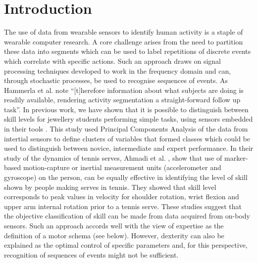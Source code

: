 \documentclass{sigchi}
\begin{document}


\section{Introduction}

The use of data from wearable sensors to identify human activity is a staple of wearable computer research.
A core challenge arises from the need to partition these data into segments 
which can be used to label repetitions of discrete events which correlate with specific actions. 
Such an approach draws on signal processing techniques developed to work in the frequency domain and can, 
through stochastic processes, be used to recognise sequences of events.  As Hammerla et al. \cite{Hammerla2011}
note ``[t]herefore information about what subjects are doing is readily available, rendering activity 
segmentation a straight-forward follow up task''. 
In previous work, we have shown that it is possible to distinguish between skill levels for jewellery 
students performing simple tasks, using sensors embedded in their tools \cite{RefXXX}.
This study used Principal Components Analysis of the data from intertial sensors to define 
clusters of variables that formed classes which could be used to distinguish between novice, intermediate 
and expert performance.  In their study of the dynamics of tennis serves,  Ahmadi et al. \cite{Ahmadi2010}, 
show that use of marker-based motion-capture or inertial measurement units (accelerometer and gyroscope) 
on the person, can be equally effective in identifying the level of skill shown by people making serves 
in tennis.  They showed that skill level corresponds to peak values in velocity for shoulder rotation, 
wrist flexion and upper arm internal rotation prior to a tennis serve. These studies suggest that the objective 
classification of skill can be made from data acquired from on-body sensors. 
Such an approach accords well with the view of expertise as the definition of a motor schema (see below). 
However, dexterity can also be explained as the optimal control of specific parameters and, for this perspective, 
recognition of sequences of events might not be sufficient. 
\end{document}
